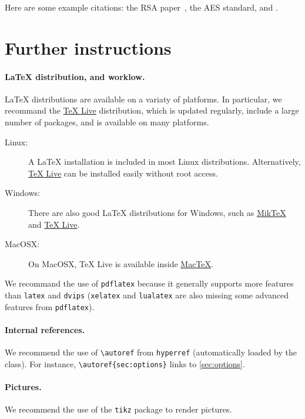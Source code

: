 \documentclass{iacrcc}
\begin{document}
Here are some example citations: the RSA paper~\cite{RSA78}, the AES
standard\cite{AES-FIPS}, and \cite{DBLP:conf/crypto/Kocher96}.

\section{Further instructions}

\paragraph{\LaTeX{} distribution, and worklow.}  \LaTeX{}
distributions are available on a variaty of platforms.  In particular,
we recommand the \href{https://www.tug.org/texlive/}{TeX Live}
distribution, which is updated regularly, include a large number of
packages, and is available on many platforms.
\begin{description}
\item[Linux:] A LaTeX installation is included in most Linux
  distributions.  Alternatively,
  \href{https://www.tug.org/texlive/}{TeX Live} can be installed
  easily without root access.
\item[Windows:] There are also good \LaTeX{} distributions for Windows,
  such as \href{http://www.miktex.org/}{MikTeX} and
  \href{https://www.tug.org/texlive/}{TeX Live}.
\item[MacOSX:] On MacOSX, TeX Live is available inside
  \href{http://www.tug.org/mactex/}{MacTeX}.
\end{description}


We recommand the use of \texttt{pdflatex} because it generally
supports more features than \texttt{latex} and \texttt{dvips}
(\texttt{xelatex} and \texttt{lualatex} are also missing some advanced
features from \texttt{pdflatex}).

\paragraph{Internal references.}

We recommend the use of \verb+\autoref+ from \texttt{hyperref}
(automatically loaded by the class).  For instance,
\verb+\autoref{sec:options}+ links to \autoref{sec:options}.

\paragraph{Pictures.}

We recommend the use of the \texttt{tikz} package to render pictures.
\end{document}
